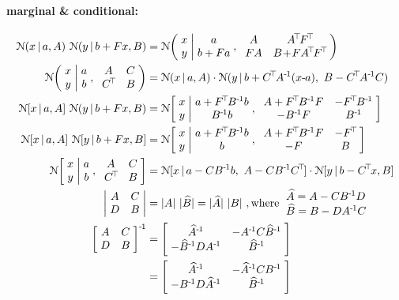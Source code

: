 
\paragraph{marginal \& conditional:}
\begin{align}
\NN(x \| a,A)~ \NN(y \| b+Fx,B)
 &= \NN\bigg( \arr{c}{x\\ y} \bigg| \arr{c}{a\\ b+Fa} ,~
             \arr{cc}{A & A^\T F^\T\\ F A & B\!+\!F A^\T F^\T} \bigg) \\
%
\NN\bigg( \arr{c}{x\\ y} \bigg| \arr{c}{a\\ b} ,~ 
         \arr{cc}{A & C\\ C^\T & B} \bigg)
&= \NN(x \| a,A) \cdot \NN(y \| b+C^\T A^\1(x\-a),~ B - C^\T A^\1 C) \\
%
\NN[ x \| a,A ]~ \NN(y \| b+Fx,B )
 &= \NN\bigg[ \arr{c}{x\\ y} \bigg| \arr{c}{a+F^\T B^\1 b \\ B^\1 b} ,~
             \arr{cc}{A+F^\T B^\1 F & -F^\T B^\1 \\ -B^\1 F & B^\1} \bigg] \\
%
\NN[x \| a,A ]~ \NN[y \| b+Fx,B ]
 &= \NN\bigg[ \arr{c}{x\\ y} \bigg| \arr{c}{a+F^\T B^\1 b \\ b} ,~
             \arr{cc}{A+F^\T B^\1  F & -F^\T \\ -F & B} \bigg] \\
%
\NN\bigg[ \arr{c}{x\\ y} \bigg| \arr{c}{a\\ b} ,~ 
         \arr{cc}{A & C\\ C^\T & B} \bigg]
&= \NN[x \| a - C B^\1 b,~ A - C B^\1 C^\T] \cdot \NN[y \| b-C^\T x,B] \\
\de{A}{C}{D}{B}
 &= |A|~ |\bar B| = |\bar A|~ |B| ~,
 \text{where } \arr{l}{ \bar A = A - C B^\1 D \\ \bar B = B - D A^\1 C }\\
\ma{A}{C}{D}{B}^\1
 &= \ma{\bar A^\1}{-A^\1 C \bar B^\1}{-\bar B^\1 D A^\1}{\bar B^\1} \\
 &= \ma{\bar A^\1}{-\bar A^\1 C B^\1}{-B^\1 D \bar A^\1}{\bar B^\1}
\end{align}

